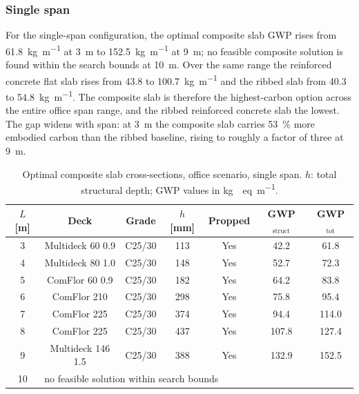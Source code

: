 \subsubsection*{Single span}
For the single-span configuration, the optimal composite slab GWP rises from \SI{61.8}{\kilo\gram\per\meter} at \SI{3}{\meter} to \SI{152.5}{\kilo\gram\per\meter} at \SI{9}{\meter}; no feasible composite solution is found within the search bounds at \SI{10}{\meter}. Over the same range the reinforced concrete flat slab rises from \SI{43.8}{} to \SI{100.7}{\kilo\gram\per\meter} and the ribbed slab from \SI{40.3}{} to \SI{54.8}{\kilo\gram\per\meter}. The composite slab is therefore the highest-carbon option across the entire office span range, and the ribbed reinforced concrete slab the lowest. The gap widens with span: at \SI{3}{\meter} the composite slab carries \SI{53}{\percent} more embodied carbon than the ribbed baseline, rising to roughly a factor of three at \SI{9}{\meter}.

\begin{table}[h!]
\small\centering
\caption{Optimal composite slab cross-sections, office scenario, single span. $h$: total structural depth; GWP values in \si{\kilo\gram{}eq\per\meter}.}
\label{tab:office_1span}
\begin{tabular}{ccccccc}
\toprule
$L$ [m] & Deck & Grade & $h$ [mm] & Propped & GWP$_\mathrm{struct}$ & GWP$_\mathrm{tot}$ \\
\midrule
3 & Multideck 60 0.9 & C25/30 & 113 & Yes & 42.2 & 61.8 \\
4 & Multideck 80 1.0 & C25/30 & 148 & Yes & 52.7 & 72.3 \\
5 & ComFlor 60 0.9   & C25/30 & 182 & Yes & 64.2 & 83.8 \\
6 & ComFlor 210      & C25/30 & 298 & Yes & 75.8 & 95.4 \\
7 & ComFlor 225      & C25/30 & 374 & Yes & 94.4 & 114.0 \\
8 & ComFlor 225      & C25/30 & 437 & Yes & 107.8 & 127.4 \\
9 & Multideck 146 1.5 & C25/30 & 388 & Yes & 132.9 & 152.5 \\
10 & \multicolumn{6}{l}{no feasible solution within search bounds} \\
\bottomrule
\end{tabular}
\end{table}

